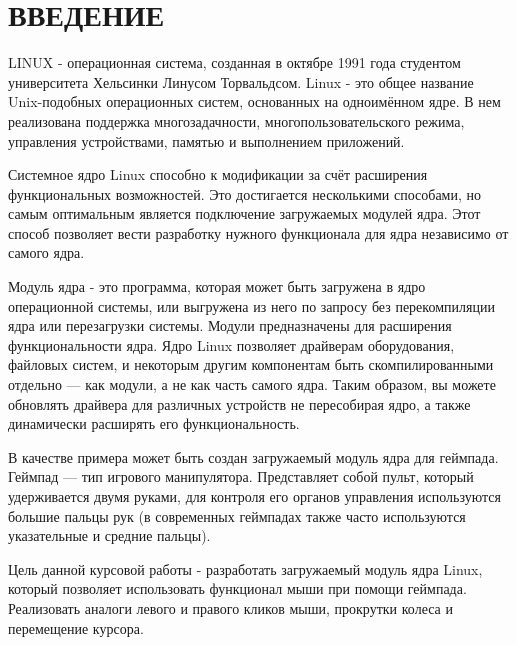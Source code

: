 \section*{ВВЕДЕНИЕ}
	LINUX - операционная система, созданная в октябре 1991 года студентом университета Хельсинки Линусом Торвальдсом. Linux - это общее название Unix-подобных операционных систем, основанных на одноимённом ядре. В нем реализована поддержка многозадачности, многопользовательского режима, управления устройствами, памятью и выполнением приложений.\par %
	Системное ядро Linux способно к модификации за счёт расширения функциональных возможностей. Это достигается несколькими способами, но самым оптимальным является подключение загружаемых модулей ядра. Этот способ позволяет вести разработку нужного функционала для ядра независимо от самого ядра.\par
	Модуль ядра - это программа, которая может быть загружена в ядро операционной системы, или выгружена из него по запросу без перекомпиляции ядра или перезагрузки системы. Модули предназначены для расширения функциональности ядра. Ядро Linux позволяет драйверам оборудования, файловых систем, и некоторым другим компонентам быть скомпилированными отдельно --- как модули, а не как часть самого ядра. Таким образом, вы можете обновлять драйвера для различных устройств не пересобирая ядро, а также динамически расширять его функциональность.\par
	В качестве примера может быть создан загружаемый модуль ядра для геймпада. 
	Геймпад — тип игрового манипулятора. Представляет собой пульт, который удерживается двумя руками, для контроля его органов управления используются большие пальцы рук (в современных геймпадах также часто используются указательные и средние пальцы).\par
	Цель данной курсовой работы - разработать загружаемый модуль ядра Linux, который позволяет использовать функционал мыши при помощи геймпада. Реализовать аналоги левого и правого кликов мыши, прокрутки колеса и перемещение курсора.\par
	
	
	
\pagebreak